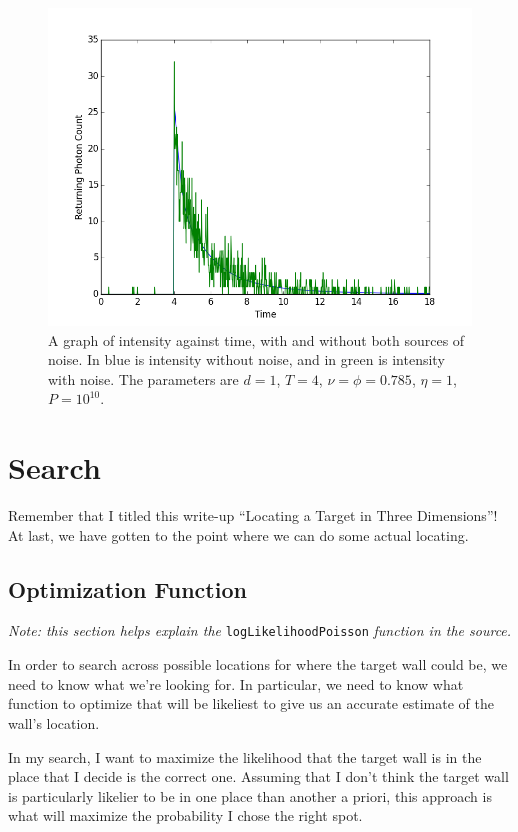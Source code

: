 \documentclass[11pt]{article}
\begin{document}
\begin{figure}
\begin{center}
\centering
\includegraphics[scale=0.5]{figs/poisson.png}
\caption{A graph of intensity against time, with and without both sources of noise. In blue is intensity without noise, and in green is intensity with noise. The parameters are $d=1$, $T=4$, $\nu=\phi=0.785$, $\eta=1$, $P = 10^{10}$. \label{fig:poisson}}
\end{center}
\end{figure}

\section{Search}

Remember that I titled this write-up ``Locating a Target in Three Dimensions''! At last, we have gotten to the point where we can do some actual locating.

\subsection{Optimization Function}

\emph{Note: this section helps explain the} \texttt{logLikelihoodPoisson} \emph{function in the source.}

In order to search across possible locations for where the target wall could be, we need to know what we're looking for. In particular, we need to know what function to optimize that will be likeliest to give us an accurate estimate of the wall's location. 

In my search, I want to maximize the likelihood that the target wall is in the place that I decide is the correct one. Assuming that I don't think the target wall is particularly likelier to be in one place than another a priori, this approach is what will maximize the probability I chose the right spot.
\end{document}
